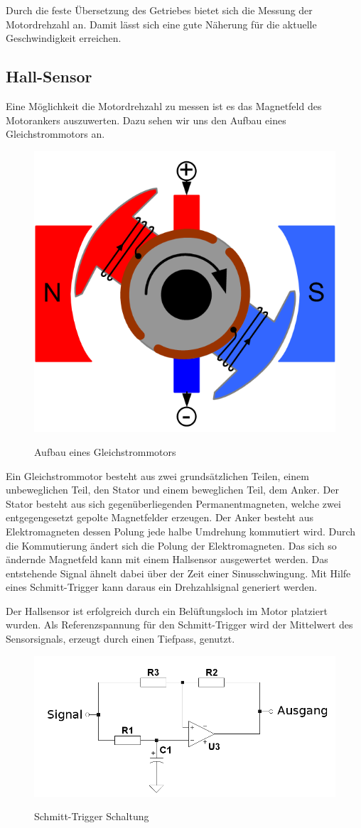 Durch die feste Übersetzung des Getriebes bietet sich die Messung der Motordrehzahl an. Damit lässt sich eine gute Näherung für die aktuelle Geschwindigkeit erreichen. 

\subsection{Hall-Sensor}
Eine Möglichkeit die Motordrehzahl zu messen ist es das Magnetfeld des
Motorankers auszuwerten. Dazu sehen wir uns den Aufbau eines Gleichstrommotors an.
\begin{figure}[H]
\centering
\includegraphics[width=.5\textwidth]{motor.png}\\
\caption{Aufbau eines Gleichstrommotors \cite{gs-motor}}%
\label{fig:aufbau_motor}
\end{figure}
Ein Gleichstrommotor besteht aus zwei grundsätzlichen Teilen, einem unbeweglichen Teil, den Stator und einem beweglichen Teil, dem Anker.
Der Stator besteht aus sich gegenüberliegenden Permanentmagneten, welche zwei entgegengesetzt gepolte Magnetfelder erzeugen.
Der Anker besteht aus Elektromagneten dessen Polung jede halbe Umdrehung kommutiert wird. Durch die Kommutierung ändert sich die 
Polung der Elektromagneten. Das sich so ändernde Magnetfeld kann mit einem Hallsensor ausgewertet werden. Das entstehende 
Signal ähnelt dabei über der Zeit einer Sinusschwingung. Mit Hilfe eines Schmitt-Trigger kann daraus ein Drehzahlsignal generiert werden.

Der Hallsensor ist erfolgreich durch ein Belüftungsloch im Motor platziert wurden. Als Referenzspannung für den Schmitt-Trigger wird der
Mittelwert des Sensorsignals, erzeugt durch einen Tiefpass, genutzt.

\begin{figure}[H]
\centering
\includegraphics[width=.5\textwidth]{schmitt.png}\\
\caption{Schmitt-Trigger Schaltung}%
\label{fig:schmitt}
\end{figure}

